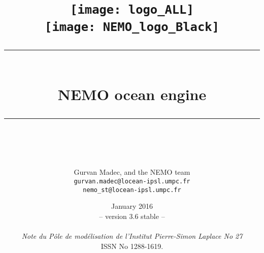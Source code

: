 \title{
\vspace{-6.0cm}
\texttt{[image: logo\_ALL]}\\
\vspace{5.1cm}
\texttt{[image: NEMO\_logo\_Black]} \\
\vspace{1.4cm}
\rule{345pt}{1.5pt} \\
\vspace{0.45cm}
{\Huge NEMO ocean engine}
\rule{345pt}{1.5pt} \\
 }
\date{
January 2016  \\
{\small  -- version 3.6 stable --} \\
~  \\
\textit{\small Note du P\^ole de mod\'{e}lisation de l'Institut Pierre-Simon Laplace No 27 }\\
\vspace{0.45cm}
{ ISSN No 1288-1619.}
}


\author{
\Large Gurvan Madec, and the NEMO team  \\
 \texttt{\small gurvan.madec@locean-ipsl.umpc.fr} \\
 \texttt{\small nemo\_st@locean-ipsl.umpc.fr} \\
}

\dominitoc
\makeindex  		%
